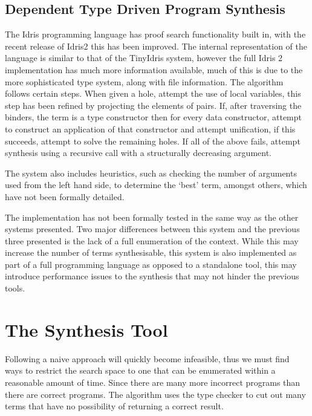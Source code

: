 \documentclass[a4paper]{article}
\begin{document}
\subsection{Dependent Type Driven Program Synthesis}
\label{sec:org2385065}
The Idris programming language has proof search functionality built in, with the recent release of Idris2 this has 
been improved. The internal representation of the language is similar to that of the TinyIdris system, 
however the full Idris 2 implementation has much more information available, much of this is due to the more sophisticated 
type system, along with file information. The algorithm follows certain steps. 
When given a hole, attempt the use of local variables, this step has been refined by projecting the elements of pairs.
If, after traversing the binders, the term is a type constructor then for every data
constructor, attempt to construct an application of that constructor and attempt unification, if this succeeds, attempt
to solve the remaining holes. If all of the above fails, attempt synthesis using a recursive call with a structurally 
decreasing argument. 

The system also includes heuristics, such as checking the number of arguments used from the left hand side, to determine
the `best' term, amongst others, which have not been formally detailed.

The implementation has not been formally tested in the same way as the other systems presented. Two major differences 
between this system and the previous three presented is the lack of a full enumeration of the context. While this may 
increase the number of terms synthesisable, this system is also implemented as part of a full programming language as 
opposed to a standalone tool, this may introduce performance issues to the synthesis that may not hinder the previous 
tools. 

\clearpage

\section{The Synthesis Tool}
\label{sec:org4165c30}
Following a naive approach will quickly become infeasible, 
thus we must find ways to restrict the search space to one 
that can be enumerated within a reasonable amount of time. 
Since there are many more incorrect programs than there are
correct programs. The algorithm uses the type checker 
to cut out many terms that have no possibility of returning a
correct result. 
\end{document}
